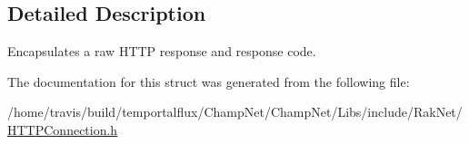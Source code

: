 \subsection{Detailed Description}
Encapsulates a raw H\-T\-T\-P response and response code. 

The documentation for this struct was generated from the following file\-:\begin{DoxyCompactItemize}
\item 
/home/travis/build/temportalflux/\-Champ\-Net/\-Champ\-Net/\-Libs/include/\-Rak\-Net/\hyperlink{_h_t_t_p_connection_8h}{H\-T\-T\-P\-Connection.\-h}\end{DoxyCompactItemize}
